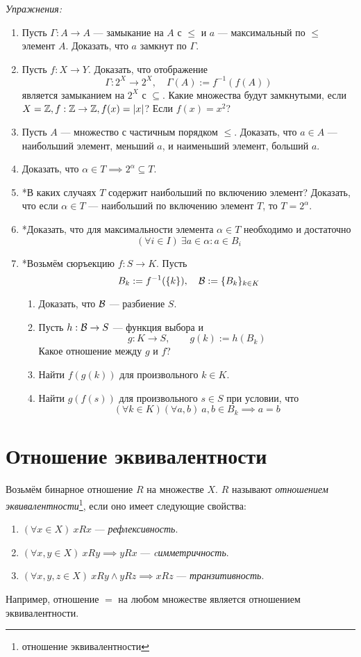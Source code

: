 \vspace{1em}
{\it Упражнения:}
\begin{enumerate}
  \item{}Пусть $\Gamma:A\to A$ --- замыкание на $A$ с $\leq$ и $a$ ---
  максимальный по $\leq$ элемент $A$. Доказать, что $a$ замкнут по $\Gamma$.
  \item{}Пусть $f:X\to Y$. Доказать, что отображение
  \[
    \Gamma:2^{X}\to 2^{X},\quad \Gamma(A):= f^{-1}(f(A))
  \]
  является замыканием на $2^{X}$ с $\subseteq$. Какие множества
  будут замкнутыми, если $X=\mathbb Z,f:\mathbb Z\to \mathbb Z,f(x)=|x|$? Если $f(x)=x^{2}$?
  \item{}Пусть $A$ --- множество с частичным порядком $\leq$.
  Доказать, что $a\in A$ --- наибольший элемент, меньший $a$,
  и наименьший элемент, больший $a$.
  \item{}Доказать, что $\alpha\in T\implies 2^{\alpha}\subseteq T$.
  \item{}*В каких случаях $T$ содержит наибольший по включению элемент?
  Доказать, что если $\alpha\in T$ --- наибольший по включению элемент $T$,
  то $T=2^{\alpha}$.
  \item{}*Доказать, что для максимальности элемента $\alpha\in T$ необходимо
  и достаточно
  \[
    (\forall i\in I)~\exists a\in\alpha:a\in B_{i}
  \]
  \item{}*Возьмём сюръекцию $f:S\to K$. Пусть
  \[
    B_{k}:=f^{-1}(\{k\}),\quad \mathcal B:=\{B_{k}\}_{k\in K}
  \]
  \begin{enumerate}
    \item{}Доказать, что $\mathcal B$ --- разбиение $S$.
    \item{}Пусть $h:\mathcal B\to S$ --- функция выбора и
    \[
      g:K\to S,\qquad g(k):=h(B_{k})
    \]
    Какое отношение между $g$ и $f$?
    \item{}Найти $f(g(k))$ для произвольного $k\in K$.
    \item{}Найти $g(f(s))$ для произвольного $s\in S$ при условии, что
    \[
      (\forall k\in K)(\forall a,b)~a,b\in B_{k}\implies a=b
    \]
  \end{enumerate}
\end{enumerate}

\section{Отношение эквивалентности}

Возьмём бинарное отношение $R$ на множестве $X$. $R$ называют
{\it отношением эквивалентности}\footnote{отношение эквивалентности},
если оно имеет следующие свойства:
\begin{enumerate}
  \item{}$(\forall x\in X)~xRx$ --- {\it рефлексивность}.
  \item{}$(\forall x,y\in X)~xRy\implies yRx$
  --- {\it cимметричность}.
  \item{}$(\forall x,y,z\in X)~xRy\land yRz\implies xRz$ --- {\it транзитивность}.
\end{enumerate}
Например, отношение $=$ на любом множестве является отношением эквивалентности.

